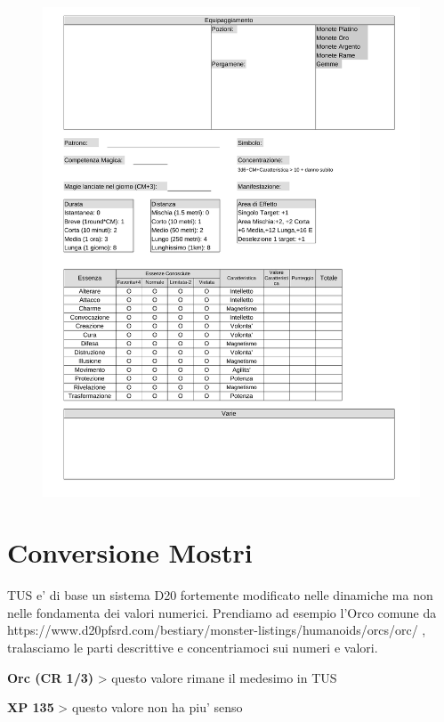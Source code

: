 \documentclass[a4paper,11pt,twoside,openany]{dndbook}
\begin{document}
\begin{figure}
	\includegraphics[width=1.13\linewidth]{TUS-Scheda-2.png}
\end{figure}


\pagebreak

\section*{Conversione Mostri}

TUS e' di base un sistema D20 fortemente modificato nelle dinamiche ma non nelle fondamenta dei valori numerici. Prendiamo ad esempio l'Orco comune da https://www.d20pfsrd.com/bestiary/monster-listings/humanoids/orcs/orc/ , tralasciamo le parti descrittive e concentriamoci sui numeri e valori.

\bigskip

\textbf{Orc (CR 1/3)} \textgreater{} questo valore rimane il medesimo in TUS

\textbf{XP 135} \textgreater{} questo valore non ha piu' senso 
\end{document}
